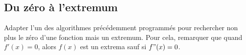 \subsection{Du zéro à l'extremum}
Adapter l'un des algorithmes précédemment programmés pour rechercher non plus
le zéro d'une fonction mais un extremum. Pour cela, remarquer que quand
 $f'(x)=0$, alors $f(x)$ est un extrema sauf si $f"(x) = 0$.
